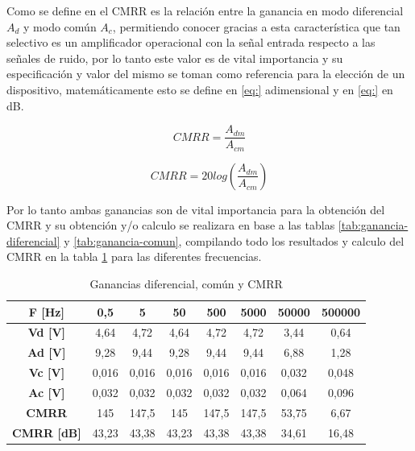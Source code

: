 Como se define en \cite{horenstein2000circuitos} el CMRR es la relación entre la ganancia en modo diferencial $A_d$ y  modo común $A_c$, permitiendo conocer gracias a esta característica que tan selectivo es un amplificador operacional con la señal entrada respecto a las señales de ruido, por lo tanto este valor es de vital importancia y su especificación y valor del mismo se toman como referencia para la elección de un dispositivo, matemáticamente esto se define en \ref{eq:} adimensional y en \ref{eq:} en dB.

\begin{equation}
	CMRR = \frac{A_{dm}}{A_{cm}}
	\label{eq:cmrr-adimensional}
\end{equation}

\begin{equation}
	CMRR = 20log(\frac{A_{dm}}{A_{cm}})
	\label{eq:cmrr-db}
\end{equation}

Por lo tanto ambas ganancias son de vital importancia para la obtención del CMRR y su obtención y/o calculo se realizara en base a las tablas \ref{tab:ganancia-diferencial} y \ref{tab:ganancia-comun}, compilando todo los resultados y calculo del CMRR en la tabla \ref{tab:cmrr} para las diferentes frecuencias.

\begin{table}[]
	\centering
	\begin{tabular}{|c|c|c|c|c|c|c|c|}
		\hline
		\textbf{F {[}Hz{]}}                          & \textbf{0,5} & \textbf{5} & \textbf{50} & \textbf{500} & \textbf{5000} & \textbf{50000} & \textbf{500000} \\ \hline
		\textbf{Vd {[}V{]}}                          & 4,64         & 4,72       & 4,64        & 4,72         & 4,72          & 3,44           & 0,64            \\ \hline
		\textbf{Ad {[}V{]}}                          & 9,28         & 9,44       & 9,28        & 9,44         & 9,44          & 6,88           & 1,28            \\ \hline
		\textbf{Vc {[}V{]}}                          & 0,016        & 0,016      & 0,016       & 0,016        & 0,016         & 0,032          & 0,048           \\ \hline
		\textbf{Ac {[}V{]}}                          & 0,032        & 0,032      & 0,032       & 0,032        & 0,032         & 0,064          & 0,096           \\ \hline
		\textbf{CMRR}                                & 145          & 147,5      & 145         & 147,5        & 147,5         & 53,75          & 6,67            \\ \hline
		\multicolumn{1}{|l|}{\textbf{CMRR {[}dB{]}}} & 43,23        & 43,38      & 43,23       & 43,38        & 43,38         & 34,61          & 16,48           \\ \hline
	\end{tabular}
	\caption{Ganancias diferencial, común y CMRR}
	\label{tab:cmrr}
\end{table}

